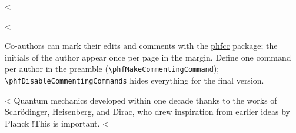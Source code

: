 

<%

<%

Co-authors can mark their edits and comments with the \href{https://ctan.org/pkg/phfcc}{phfcc} package; the initials of the author appear once per page in the margin.
Define one command per author in the preamble (\verb|\phfMakeCommentingCommand|); \verb|\phfDisableCommentingCommands| hides everything for the final version.

<%
Quantum mechanics developed within one decade thanks to the works of Schrödinger, Heisenberg, and Dirac,
who drew inspiration from earlier ideas by Planck  
 \FA!{This is important.}
<%
